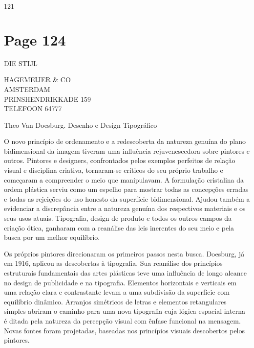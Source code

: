\documentclass[a4paper]{article}
\begin{document}
\vfill
\null\hfill 121

\newpage
\section*{Page 124}

\raggedleft
DIE STIJL

\vspace{0.5em} %

HAGEMEIJER \& CO \\
AMSTERDAM \\
PRINSHENDRIKKADE 159 \\
TELEFOON 64777
\par
\raggedright %

\bigskip %

Theo Van Doesburg. Desenho e Design Tipográfico

\bigskip %

O novo princípio de ordenamento e a redescoberta da natureza genuína do plano bidimensional da imagem tiveram uma influência rejuvenescedora sobre pintores e outros. Pintores e designers, confrontados pelos exemplos perfeitos de relação visual e disciplina criativa, tornaram-se críticos do seu próprio trabalho e começaram a compreender o meio que manipulavam. A formulação cristalina da ordem plástica serviu como um espelho para mostrar todas as concepções erradas e todas as rejeições do uso honesto da superfície bidimensional. Ajudou também a evidenciar a discrepância entre a natureza genuína dos respectivos materiais e os seus usos atuais. Tipografia, design de produto e todos os outros campos da criação ótica, ganharam com a reanálise das leis inerentes do seu meio e pela busca por um melhor equilíbrio.

Os próprios pintores direcionaram os primeiros passos nesta busca. Doesburg, já em 1916, aplicou as descobertas à tipografia. Sua reanálise dos princípios estruturais fundamentais das artes plásticas teve uma influência de longo alcance no design de publicidade e na tipografia. Elementos horizontais e verticais em uma relação clara e contrastante levam a uma subdivisão da superfície com equilíbrio dinâmico. Arranjos simétricos de letras e elementos retangulares simples abriram o caminho para uma nova tipografia cuja lógica espacial interna é ditada pela natureza da percepção visual com ênfase funcional na mensagem. Novas fontes foram projetadas, baseadas nos princípios visuais descobertos pelos pintores.
\end{document}
